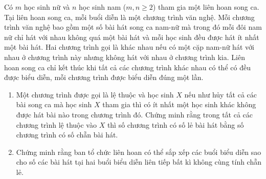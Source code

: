 \begin{bt}[VMO 2015]%
	Có $m$ học sinh nữ và $n$ học sinh nam ($m,n \ge2$) tham gia một liên hoan song ca. Tại liên hoan song ca, mỗi buổi diễn là một chương trình văn nghệ. Mỗi chương trình văn nghệ bao gồm một số bài hát song ca nam-nữ mà trong đó mỗi đôi nam nữ chỉ hát với nhau không quá một bài hát và mỗi học sinh đều được hát ít nhất một bài hát. Hai chương trình gọi là khác nhau nếu có một cặp nam-nữ hát với nhau ở chương trình này nhưng không hát với nhau ở chương trình kia. Liên hoan song ca chỉ kết thúc khi tất cả các chương trình khác nhau có thể có đều được biểu diễn, mỗi chương trình được biểu diễn đúng một lần.
	\begin{enumerate}
		\item Một chương trình được gọi là lệ thuộc và học sinh $X$ nếu như hủy tất cả các bài song ca mà học sinh $X$ tham gia thì có ít nhất một học sinh khác không được hát bài nào trong chương trình đó. Chứng minh rằng trong tất cả các chương trình lệ thuộc vào $X$ thì số chương trình có số lẻ bài hát bằng số chương trình có số chẵn bài hát. 
		\item Chứng minh rằng ban tổ chức liên hoan có thể sắp xếp các buổi biểu diễn sao cho số các bài hát tại hai buổi biểu diễn liên tiếp bất kì không cùng tính chẵn lẻ. 
	\end{enumerate}
	

\end{bt}
